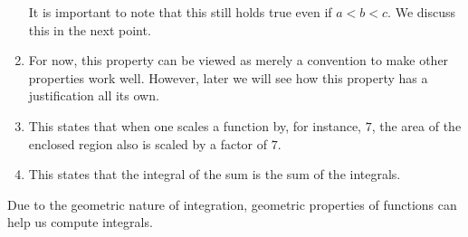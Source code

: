 \documentclass{ximera}
\begin{document}
\begin{theorem}
\begin{explanation}
\begin{enumerate}
\begin{image}
  \end{image}		
  It is important to note that this still holds true even if
  $a<b<c$. We discuss this in the next point.
  
\item For now, this property can be viewed as merely a convention to
  make other properties work well. However, later we will see how this
  property has a justification all its own.

\item This states that when one scales a function by, for instance, $7$,
  the area of the enclosed region also is scaled by a factor of
  $7$.
\item This states that the integral of the sum is the sum of the
  integrals.
\end{enumerate}
\end{explanation}
\end{theorem}

Due to the geometric nature of integration, geometric properties of
functions can help us compute integrals.
\end{document}
